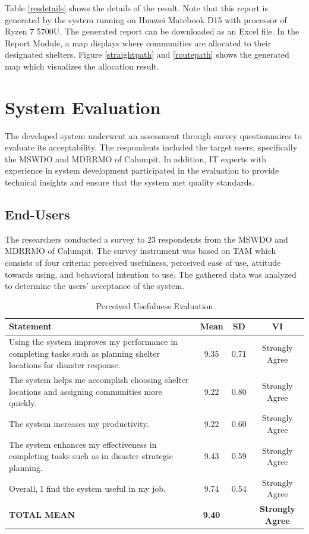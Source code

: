 	 Table \ref{resdetails} shows the details of the result. Note that this report is generated by the system running on Huawei Matebook D15 with processor of Ryzen 7 5700U. The generated report can be downloaded as an Excel file. In the Report Module, a map displays where communities are allocated to their designated shelters. Figure \ref{straightpath} and \ref{routepath} shows the generated map which visualizes the allocation result.
	
\section{System Evaluation}
	The developed system underwent an assessment through survey questionnaires to evaluate its acceptability. The respondents included the target users, specifically the MSWDO and MDRRMO of Calumpit. In addition, IT experts with experience in system development participated in the evaluation to provide technical insights and ensure that the system met quality standards.

\subsection{End-Users}
	The researchers conducted a survey to 23 respondents from the MSWDO and MDRRMO of Calumpit. The survey instrument was based on TAM which consists of four criteria: perceived usefulness, perceived ease of use, attitude towards using, and behavioral intention to use. The gathered data was analyzed to determine the users’ acceptance of the system. 

	\begin{table}[h!]
		\centering
		\caption{Perceived Usefulness Evaluation}
		\label{percuse}
		\renewcommand{\arraystretch}{1.2}
		\begin{tabularx}{\linewidth}{|X|c|c|c|}
			\hline
			\textbf{Statement} & \textbf{Mean} & \textbf{SD} & \textbf{VI} \\ \hline
			Using the system improves my performance in completing tasks such as planning shelter locations for disaster response.
			& 9.35 & 0.71 & Strongly Agree \\ \hline
			The system helps me accomplish choosing shelter locations and assigning communities more quickly.
			& 9.22& 0.80 & Strongly Agree  \\ \hline
			The system increases my productivity.
			& 9.22 & 0.60 & Strongly Agree  \\ \hline
			The system enhances my effectiveness in completing tasks such as in disaster strategic planning.
			& 9.43 & 0.59 & Strongly Agree  \\ \hline
			Overall, I find the system useful in my job.
			& 9.74 & 0.54 & Strongly Agree  \\ \hline
			\textbf{TOTAL MEAN} & \textbf{9.40} & & \textbf{Strongly Agree}  \\ \hline
		\end{tabularx}
	\end{table}
	
